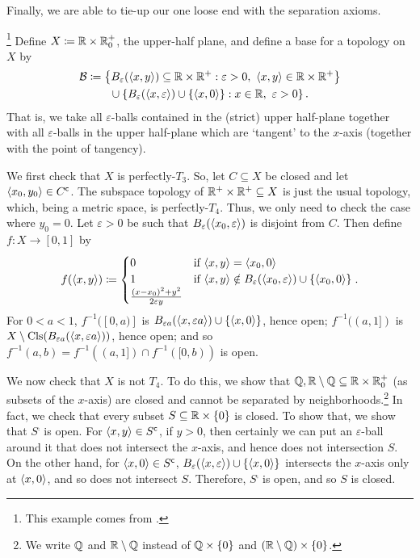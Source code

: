 Finally, we are able to tie-up our one loose end with the separation axioms.
\begin{exm}\footnote{This example comes from \cite[pg.~100]{Steen}.}\label{NiemytzkisTangentDiskTopology}
Define $X\coloneqq \mathbb{R} \times \mathbb{R} _0^+$, the upper-half plane, and define a base for a topology on $X$ by
\begin{equation}
\begin{split}
\mathcal{B} & \coloneqq \left\{ B_\varepsilon (\langle x,y\rangle)\subseteq \mathbb{R} \times \mathbb{R} ^+:\varepsilon >0,\ \langle x,y\rangle\in \mathbb{R} \times \mathbb{R} ^+\right\} \\
& \qquad \cup \left\{ B_\varepsilon (\langle x,\varepsilon\rangle)\cup \{ \langle x,0\rangle\} :x\in \mathbb{R} ,\ \varepsilon >0\right\} .
\end{split}
\end{equation}
That is, we take all $\varepsilon$-balls contained in the (strict) upper half-plane together with all $\varepsilon$-balls in the upper half-plane which are `tangent' to the $x$-axis (together with the point of tangency).

We first check that $X$ is perfectly-$T_3$.  So, let $C\subseteq X$ be closed and let $\langle x_0,y_0\rangle\in C^{\mathsf{c}}$.  The subspace topology of $\mathbb{R} ^+\times \mathbb{R} ^+\subseteq X$ is just the usual topology, which, being a metric space, is perfectly-$T_4$.  Thus, we only need to check the case where $y_0=0$.  Let $\varepsilon >0$ be such that $B_{\varepsilon}(\langle x_0,\varepsilon\rangle)$ is disjoint from $C$.  Then define $f:X\rightarrow [0,1]$ by
\begin{equation}
f(\langle x,y\rangle)\coloneqq \begin{cases}0 & \text{if }\langle x,y\rangle=\langle x_0,0\rangle \\ 1 & \text{if }\langle x,y\rangle\notin B_{\varepsilon}(\langle x_0,\varepsilon\rangle)\cup \{ \langle x_0,0\rangle\} \\ \frac{(x-x_0)^2+y^2}{2\varepsilon y}\end{cases}.
\end{equation}
For $0<a<1$, $f^{-1}([0,a)]$ is $B_{\varepsilon a}(\langle x,\varepsilon a\rangle)\cup \{ \langle x,0\rangle\}$, hence open; $f^{-1}((a,1])$ is $X\setminus \operatorname{Cls} (B_{\varepsilon a}(\langle x,\varepsilon a\rangle))$, hence open; and so $f^{-1}(a,b)=f^{-1}((a,1])\cap f^{-1}([0,b))$ is open.

We now check that $X$ is not $T_4$.  To do this, we show that $\mathbb{Q} ,\mathbb{R} \setminus \mathbb{Q} \subseteq \mathbb{R} \times \mathbb{R} _0^+$ (as subsets of the $x$-axis) are closed and cannot be separated by neighborhoods.\footnote{We write $\mathbb{Q}$ and $\mathbb{R} \setminus \mathbb{Q}$ instead of $\mathbb{Q} \times \{ 0\}$ and $(\mathbb{R} \setminus \mathbb{Q} )\times \{ 0\}$.}  In fact, we check that every subset $S\subseteq \mathbb{R} \times \{ 0\}$ is closed.  To show that, we show that $S^{\comp}$ is open.  For $\langle x,y\rangle\in S^{\mathsf{c}}$, if $y>0$, then certainly we can put an $\varepsilon$-ball around it that does not intersect the $x$-axis, and hence does not intersection $S$.  On the other hand, for $\langle x,0\rangle\in S^{\mathsf{c}}$, $B_{\varepsilon}(\langle x,\varepsilon\rangle)\cup \{ \langle x,0\rangle\}$ intersects the $x$-axis only at $\langle x,0\rangle$, and so does not intersect $S$.  Therefore, $S^{\comp}$ is open, and so $S$ is closed.


\end{exm}
